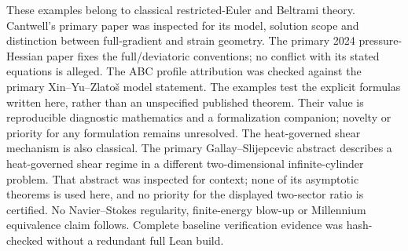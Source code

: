 \documentclass[11pt]{article}
\begin{document}
These examples belong to classical restricted-Euler and Beltrami
theory. Cantwell's primary paper was inspected for its model, solution
scope and distinction between full-gradient and strain geometry.
The primary 2024 pressure-Hessian paper fixes the full/deviatoric
conventions; no conflict with its stated equations is alleged.
The ABC profile attribution was checked against the primary
Xin--Yu--Zlato\v{s} model statement. The examples test the explicit
formulas written here, rather than an unspecified published theorem.
Their value is reproducible diagnostic mathematics and a formalization
companion; novelty or priority for any formulation remains unresolved.
The heat-governed shear mechanism is also classical. The primary Gallay--Slijepcevic
abstract \cite{GS} describes a heat-governed shear regime in a different
two-dimensional infinite-cylinder problem. That abstract was inspected for
context; none of its asymptotic theorems is used here, and no priority for
the displayed two-sector ratio is certified.
No Navier--Stokes regularity, finite-energy blow-up or Millennium
equivalence claim follows. Complete baseline verification evidence was
hash-checked without a redundant full Lean build.
\par\endgroup
\end{document}
